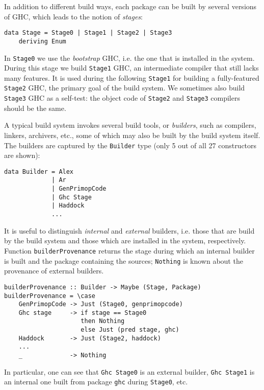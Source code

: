 In addition to different build ways, each package can be built by several
versions of GHC, which leads to the notion of \emph{stages}:

\begin{lstlisting}[basicstyle=\ttfamily]
data Stage = Stage0 | Stage1 | Stage2 | Stage3
    deriving Enum
\end{lstlisting}

In \texttt{Stage0} we use the \emph{bootstrap} GHC, i.e. the one that is
installed in the system. During this stage we build \texttt{Stage1} GHC, an
intermediate compiler that still lacks many features. It is used during the
following \texttt{Stage1} for building a fully-featured \texttt{Stage2} GHC, the
primary goal of the build system. We sometimes also build \texttt{Stage3} GHC as
a self-test: the object code of \texttt{Stage2} and \texttt{Stage3} compilers
should be the same.

A typical build system invokes several build tools, or \emph{builders}, such as
compilers, linkers, archivers, etc., some of which may also be built by the
build system itself. The builders are captured by the \texttt{Builder} type
(only 5 out of all 27 constructors are shown):

\begin{lstlisting}[basicstyle=\ttfamily]
data Builder = Alex
             | Ar
             | GenPrimopCode
             | Ghc Stage
             | Haddock
             ...
\end{lstlisting}

It is useful to distinguish \emph{internal} and \emph{external} builders, i.e.
those that are build by the build system and those which are installed in the
system, respectively. Function \texttt{builderProvenance} returns the stage
during which an internal builder is built and the package containing the
sources; \texttt{Nothing} is known about the provenance of external builders.

\begin{lstlisting}[basicstyle=\ttfamily]
builderProvenance :: Builder -> Maybe (Stage, Package)
builderProvenance = \case
    GenPrimopCode -> Just (Stage0, genprimopcode)
    Ghc stage     -> if stage == Stage0
                     then Nothing
                     else Just (pred stage, ghc)
    Haddock       -> Just (Stage2, haddock)
    ...
    _             -> Nothing
\end{lstlisting}

In particular, one can see that \texttt{Ghc Stage0} is an external builder,
\texttt{Ghc Stage1} is an internal one built from package \texttt{ghc}
during \texttt{Stage0}, etc.

